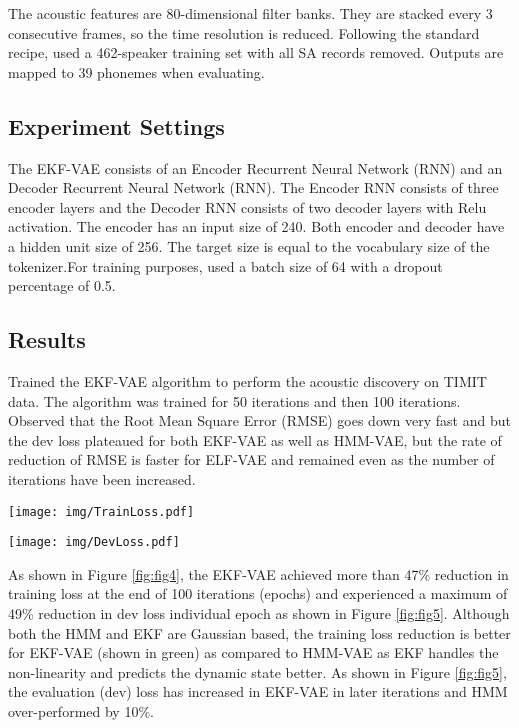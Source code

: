 \documentclass{article}
\begin{document}
The acoustic features are 80-dimensional filter banks. They are stacked every 3 consecutive frames, so the time resolution is reduced. Following the standard recipe, used a 462-speaker training set with all SA records removed. Outputs are mapped to 39 phonemes when evaluating.

\subsection{Experiment Settings}
The EKF-VAE consists of an Encoder Recurrent Neural Network (RNN) and an Decoder Recurrent Neural Network (RNN). The Encoder RNN consists of three encoder layers and the Decoder RNN consists of two decoder layers with Relu activation. 
The encoder has an input size of 240. Both encoder and decoder have a hidden unit size of 256. The target size is equal to the vocabulary size of the tokenizer.For training purposes, used a batch size of 64 with a dropout percentage of 0.5.

\subsection{Results}
Trained the EKF-VAE algorithm to perform the acoustic discovery on TIMIT data. The algorithm was trained for 50 iterations and then 100 iterations. Observed that the Root Mean Square Error (RMSE) goes down very fast and but the dev loss plateaued for both EKF-VAE as well as HMM-VAE, but the rate of reduction of RMSE is faster for ELF-VAE and remained even as the number of iterations have been increased.

\begin{figure*}[h]
  \centering
  \begin{minipage}[b]{0.4\textwidth}
    \texttt{[image: img/TrainLoss.pdf]}
    \caption{Training Loss}
    \label{fig:fig4}
  \end{minipage}
  \hfill
  \begin{minipage}[b]{0.4\textwidth}
    \texttt{[image: img/DevLoss.pdf]}
    \caption{Evaluation/Dev Loss}
    \label{fig:fig5}
  \end{minipage} 
\end{figure*}
As shown in Figure \ref{fig:fig4}, the EKF-VAE achieved more than 47\% reduction in training loss at the end of 100 iterations (epochs) and experienced a maximum of 49\% reduction in dev loss individual epoch as shown in Figure \ref{fig:fig5}. Although both the HMM and EKF are Gaussian based, the training loss reduction is better for EKF-VAE (shown in green) as compared to HMM-VAE as EKF handles the non-linearity and predicts the dynamic state better. As shown in Figure \ref{fig:fig5}, the evaluation (dev) loss has increased in EKF-VAE in later iterations and HMM over-performed by 10\%.
\end{document}

